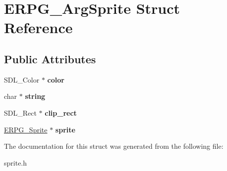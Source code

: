 \hypertarget{structERPG__ArgSprite}{\section{E\-R\-P\-G\-\_\-\-Arg\-Sprite Struct Reference}
\label{structERPG__ArgSprite}
}
\subsection*{Public Attributes}
\begin{DoxyCompactItemize}
\item 
\hypertarget{structERPG__ArgSprite_a951340599d757a79d509af828ae907b0}{S\-D\-L\-\_\-\-Color $\ast$ {\bfseries color}}\label{structERPG__ArgSprite_a951340599d757a79d509af828ae907b0}

\item 
\hypertarget{structERPG__ArgSprite_ac92660bf9992ca84fff637a24cafc56f}{char $\ast$ {\bfseries string}}\label{structERPG__ArgSprite_ac92660bf9992ca84fff637a24cafc56f}

\item 
\hypertarget{structERPG__ArgSprite_af5560d11385cea4c4c2477331358f360}{S\-D\-L\-\_\-\-Rect $\ast$ {\bfseries clip\-\_\-rect}}\label{structERPG__ArgSprite_af5560d11385cea4c4c2477331358f360}

\item 
\hypertarget{structERPG__ArgSprite_ad08001aeadd906e0fa96fafc20c7ee49}{\hyperlink{structERPG__Sprite}{E\-R\-P\-G\-\_\-\-Sprite} $\ast$ {\bfseries sprite}}\label{structERPG__ArgSprite_ad08001aeadd906e0fa96fafc20c7ee49}

\end{DoxyCompactItemize}


The documentation for this struct was generated from the following file\-:\begin{DoxyCompactItemize}
\item 
sprite.\-h\end{DoxyCompactItemize}
